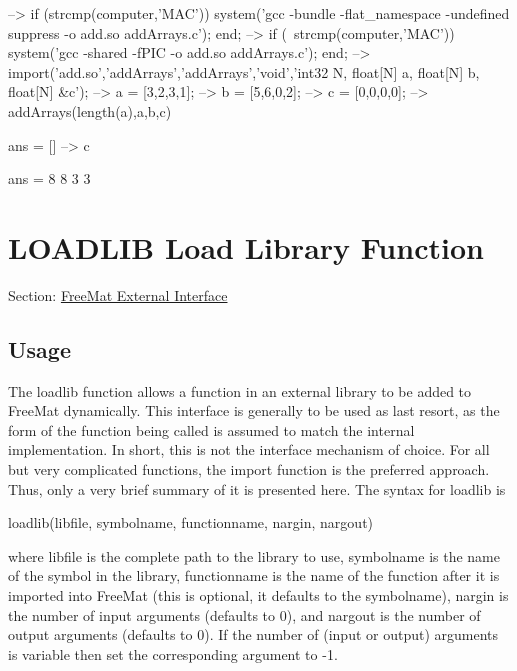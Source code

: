 \begin{DoxyVerbInclude}
--> if (strcmp(computer,'MAC')) system('gcc -bundle -flat_namespace -undefined suppress -o add.so addArrays.c'); end;
--> if (~strcmp(computer,'MAC')) system('gcc -shared -fPIC -o add.so addArrays.c'); end;
--> import('add.so','addArrays','addArrays','void','int32 N, float[N] a, float[N] b, float[N] &c');
--> a = [3,2,3,1];
--> b = [5,6,0,2]; 
--> c = [0,0,0,0];
--> addArrays(length(a),a,b,c)

ans = 
  []
--> c

ans = 
 8 8 3 3 
\end{DoxyVerbInclude}
 \hypertarget{external_loadlib}{}\section{L\-O\-A\-D\-L\-I\-B Load Library Function}\label{external_loadlib}
Section\-: \hyperlink{sec_external}{Free\-Mat External Interface} \hypertarget{vtkwidgets_vtkxyplotwidget_Usage}{}\subsection{Usage}\label{vtkwidgets_vtkxyplotwidget_Usage}
The {\ttfamily loadlib} function allows a function in an external library to be added to Free\-Mat dynamically. This interface is generally to be used as last resort, as the form of the function being called is assumed to match the internal implementation. In short, this is not the interface mechanism of choice. For all but very complicated functions, the {\ttfamily import} function is the preferred approach. Thus, only a very brief summary of it is presented here. The syntax for {\ttfamily loadlib} is \begin{DoxyVerb}  loadlib(libfile, symbolname, functionname, nargin, nargout)
\end{DoxyVerb}
 where {\ttfamily libfile} is the complete path to the library to use, {\ttfamily symbolname} is the name of the symbol in the library, {\ttfamily functionname} is the name of the function after it is imported into Free\-Mat (this is optional, it defaults to the {\ttfamily symbolname}), {\ttfamily nargin} is the number of input arguments (defaults to 0), and {\ttfamily nargout} is the number of output arguments (defaults to 0). If the number of (input or output) arguments is variable then set the corresponding argument to {\ttfamily -\/1}. 